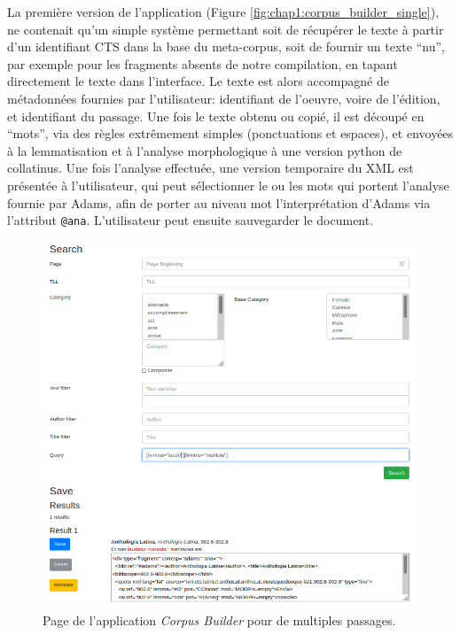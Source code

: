 La première version de l'application (Figure \ref{fig:chap1:corpus_builder_single}), ne contenait qu'un simple système permettant soit de récupérer le texte à partir d'un identifiant CTS dans la base du meta-corpus, soit de fournir un texte \enquote{nu}, par exemple pour les fragments absents de notre compilation, en tapant directement le texte dans l'interface. Le texte est alors accompagné de métadonnées fournies par l'utilisateur: identifiant de l'oeuvre, voire de l'édition, et identifiant du passage. Une fois le texte obtenu ou copié, il est découpé en \enquote{mots}, via des règles extrêmement simples (ponctuations et espaces), et envoyées à la lemmatisation et à l'analyse morphologique à une version python de collatinus. Une fois l'analyse effectuée, une version temporaire du XML est présentée à l'utilisateur, qui peut sélectionner le ou les mots qui portent l'analyse fournie par Adams, afin de porter au niveau mot l'interprétation d'Adams via l'attribut \texttt{@ana}. L'utilisateur peut ensuite sauvegarder le document.

\begin{figure}
    \centering
    \includegraphics[width=\textwidth]{figures/chap1/part3/exemplier/corpus_builder_multiple.png}
    \caption{Page de l'application \textit{Corpus Builder} pour de multiples passages.}
    \label{fig:chap1:corpus_builder_mult}
\end{figure}

